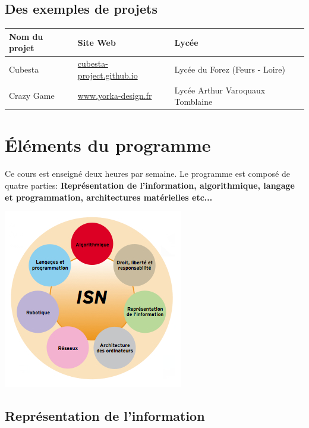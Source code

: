 \documentclass[a4paper, 12pt]{article}
\begin{document}
          \subsection{Des exemples de projets}
 \begin{center}
 \end{center}         
    \begin{tabular}{|l|l|l|} \hline    

\textbf{Nom du projet} & \textbf{Site Web} & \textbf{Lycée}\\ \hline
    
Cubesta&\href{http://cubesta-project.github.io/CubeSTA/}{cubesta-project.github.io}&Lycée du Forez (Feurs - Loire)\\ \hline 
    
Crazy Game&\href{http://www.yorka-design.fr/ISN/}{www.yorka-design.fr}&Lycée Arthur Varoquaux Tomblaine \\ \hline

    \end{tabular}
    
      \section{Éléments du programme}
Ce cours est enseigné deux heures par semaine. Le programme est composé de quatre parties: \textbf{ Représentation de l’information, algorithmique, langage et programmation, architectures matérielles etc...}
\vfill
\begin{center} \includegraphics[scale=0.6]{isn.png} \end{center}
\vfill

      \subsection{Représentation de l'information}
  
\end{document}
